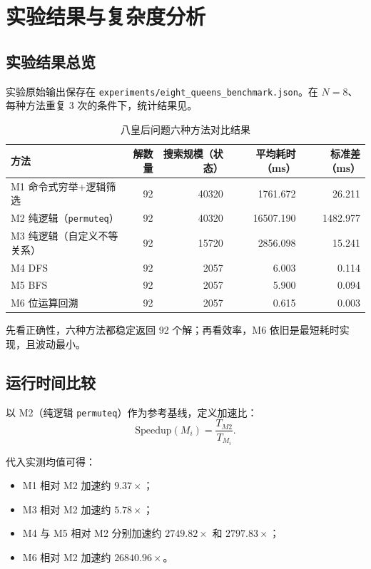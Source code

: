﻿\chapter{实验结果与复杂度分析}\label{chap:math}

\section{实验结果总览}

实验原始输出保存在 \texttt{experiments/eight\_queens\_benchmark.json}。在 $N=8$、每种方法重复 3 次的条件下，统计结果见。

\begin{table}[htbp]
  \centering
  \caption{八皇后问题六种方法对比结果}\label{tab:benchmark-main}
  \begin{tabular}{lrrrr}
    \toprule
    方法                        & 解数量 & 搜索规模（状态） & 平均耗时（ms）  & 标准差（ms）  \\
    \midrule
    M1 命令式穷举+逻辑筛选             & 92  & 40320    & 1761.672  & 26.211   \\
    M2 纯逻辑（\texttt{permuteq}） & 92  & 40320    & 16507.190 & 1482.977 \\
    M3 纯逻辑（自定义不等关系）           & 92  & 15720    & 2856.098  & 15.241   \\
    M4 DFS                    & 92  & 2057     & 6.003     & 0.114    \\
    M5 BFS                    & 92  & 2057     & 5.900     & 0.094    \\
    M6 位运算回溯                  & 92  & 2057     & 0.615     & 0.003    \\
    \bottomrule
  \end{tabular}
\end{table}

先看正确性，六种方法都稳定返回 92 个解；再看效率，M6 依旧是最短耗时实现，且波动最小。

\section{运行时间比较}

以 M2（纯逻辑 \texttt{permuteq}）作为参考基线，定义加速比：
\begin{equation}
  \text{Speedup}(M_i)=\frac{T_{M2}}{T_{M_i}}.
\end{equation}

代入实测均值可得：
\begin{itemize}
  \item M1 相对 M2 加速约 $9.37\times$；
  \item M3 相对 M2 加速约 $5.78\times$；
  \item M4 与 M5 相对 M2 分别加速约 $2749.82\times$ 和 $2797.83\times$；
  \item M6 相对 M2 加速约 $26840.96\times$。
\end{itemize}

